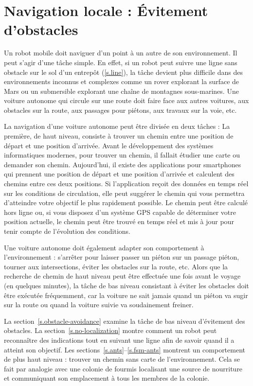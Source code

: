 
\chapter{Navigation locale : Évitement d'obstacles}\label{ch.obstacle}

Un robot mobile doit naviguer d'un point à un autre de son environnement. Il peut s'agir d'une tâche simple. En effet, si un robot peut suivre une ligne sans obstacle sur le sol d'un entrepôt (\ref{s.line}), la tâche devient plus difficile dans des environnements inconnus et complexes comme un rover explorant la surface de Mars ou un submersible explorant une chaîne de montagnes sous-marines. Une voiture autonome qui circule sur une route doit faire face aux autres voitures, aux obstacles sur la route, aux passages pour piétons, aux travaux sur la voie, etc. 

La navigation d'une voiture autonome peut être divisée en deux tâches : La première, de haut niveau, consiste à trouver un chemin entre une position de départ et une position d'arrivée. Avant le développement des systèmes informatiques modernes, pour trouver un chemin, il fallait étudier une carte ou demander son chemin. Aujourd'hui, il existe des applications pour smartphones qui prennent une position de départ et une position d'arrivée et calculent des chemins entre ces deux positions. Si l'application reçoit des données en temps réel sur les conditions de circulation, elle peut suggérer le chemin qui vous permettra d'atteindre votre objectif le plus rapidement possible. Le chemin peut être calculé hors ligne ou, si vous disposez d'un système GPS capable de déterminer votre position actuelle, le chemin peut être trouvé en temps réel et mis à jour pour tenir compte de l'évolution des conditions.

Une voiture autonome doit également adapter son comportement à l'environnement : s'arrêter pour laisser passer un piéton sur un passage piéton, tourner aux intersections, éviter les obstacles sur la route, etc. Alors que la recherche de chemin de haut niveau peut être effectuée une fois avant le voyage (en quelques minutes), la tâche de bas niveau consistant à éviter les obstacles doit être exécutée fréquemment, car la voiture ne sait jamais quand un piéton va sugir sur la route ou quand la voiture suivie va soudainement freiner.

La section~\ref{s.obstacle-avoidance} examine la tâche de bas niveau d'évitement des obstacles. La section~\ref{s.no-localization} montre comment un robot peut reconnaître des indications tout en suivant une ligne afin de savoir quand il a atteint son objectif. Les sections~\ref{s.ants}--\ref{s.fsm-ants} montrent un comportement de plus haut niveau : trouver un chemin sans carte de l'environnement. Cela se fait par analogie avec une colonie de fourmis localisant une source de nourriture et communiquant son emplacement à tous les membres de la colonie.

